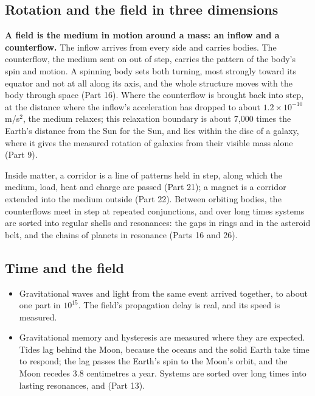 \documentclass[11pt,a4paper]{article}
\begin{document}
\subsection{Rotation and the field in three dimensions}

\begin{hypbar}
\textbf{A field is the medium in motion around a mass: an inflow and a counterflow.} The inflow arrives from every side and carries bodies. The counterflow, the medium sent on out of step, carries the pattern of the body's spin and motion. A spinning body sets both turning, most strongly toward its equator and not at all along its axis, and the whole structure moves with the body through space (Part 16). Where the counterflow is brought back into step, at the distance where the inflow's acceleration has dropped to about $1.2\times10^{-10}$ m/s$^2$, the medium relaxes; this relaxation boundary is about 7,000 times the Earth's distance from the Sun for the Sun, and lies within the disc of a galaxy, where it gives the measured rotation of galaxies from their visible mass alone (Part 9).\footnotemark{}
\end{hypbar}

 Inside matter, a corridor is a line of patterns held in step, along which the medium, load, heat and charge are passed (Part 21); a magnet is a corridor extended into the medium outside (Part 22). Between orbiting bodies, the counterflows meet in step at repeated conjunctions, and over long times systems are sorted into regular shells and resonances: the gaps in rings and in the asteroid belt, and the chains of planets in resonance (Parts 16 and 26).

\subsection{Time and the field}

\begin{itemize}
\item {} Gravitational waves and light from the same event arrived together, to about one part in $10^{15}$. The field's propagation delay is real, and its speed is measured.
\item {} Gravitational memory and hysteresis are measured where they are expected. Tides lag behind the Moon, because the oceans and the solid Earth take time to respond; the lag passes the Earth's spin to the Moon's orbit, and the Moon recedes 3.8 centimetres a year. Systems are sorted over long times into lasting resonances, and  (Part 13).
\end{itemize}
\end{document}
